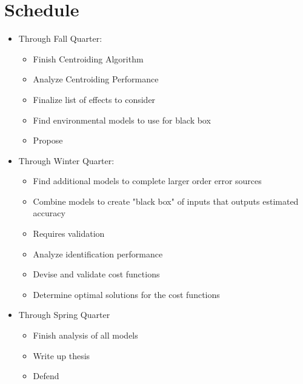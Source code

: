 \section{Schedule}
\begin{itemize}
    \item Through Fall Quarter:
    \begin{itemize}
        \item Finish Centroiding Algorithm 
        \item Analyze Centroiding Performance
        \item Finalize list of effects to consider
        \item Find environmental models to use for black box
        \item Propose
    \end{itemize}
    \item Through Winter Quarter:
    \begin{itemize}
        \item Find additional models to complete larger order error sources 
        \item Combine models to create "black box" of inputs that outputs estimated accuracy
        \item Requires validation
        \item Analyze identification performance
        \item Devise and validate cost functions 
        \item Determine optimal solutions for the cost functions  
    \end{itemize}
    \item Through Spring Quarter
    \begin{itemize}
        \item Finish analysis of all models
        \item Write up thesis
        \item Defend
    \end{itemize}
\end{itemize}

